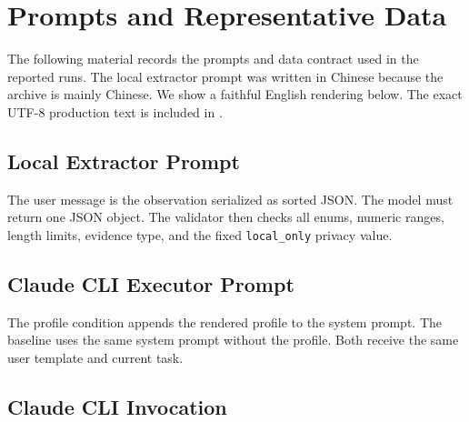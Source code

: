 \section{Prompts and Representative Data}
\label{app:prompts-data}

The following material records the prompts and data contract used in the
reported runs. The local extractor prompt was written in Chinese because the
archive is mainly Chinese. We show a faithful English rendering below. The
exact UTF-8 production text is included in
.

\subsection{Local Extractor Prompt}

\begin{PromptBox}

\end{PromptBox}

The user message is the observation serialized as sorted JSON. The model must
return one JSON object. The validator then checks all enums, numeric ranges,
length limits, evidence type, and the fixed \texttt{local\_only} privacy value.

\subsection{Claude CLI Executor Prompt}

\begin{PromptBox}

\end{PromptBox}

The profile condition appends the rendered profile to the system prompt. The
baseline uses the same system prompt without the profile. Both receive the same
user template and current task.

\subsection{Claude CLI Invocation}

\begin{PromptBox}

\end{PromptBox}

